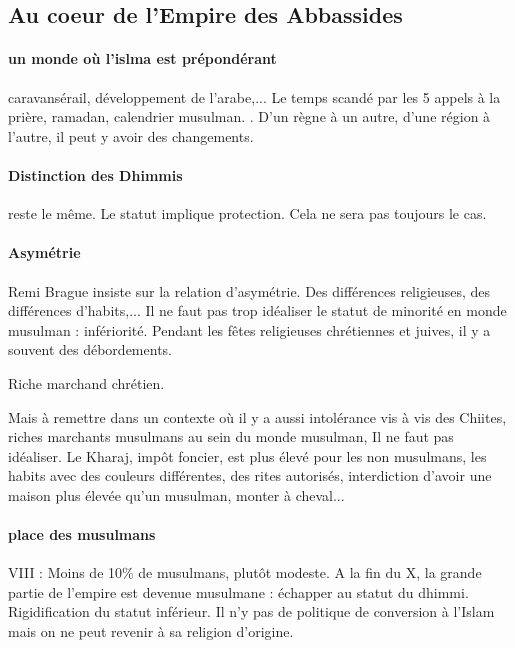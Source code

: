 \subsection{Au coeur de l'Empire des Abbassides}

\paragraph{un monde où l'islma est prépondérant} caravansérail, développement de l'arabe,... Le temps scandé par les 5 appels à la prière, ramadan, calendrier musulman.  . D'un règne à un autre, d'une région à l'autre, il peut y avoir des changements.

\paragraph{Distinction des Dhimmis} reste le même. Le statut implique protection. Cela ne sera pas toujours le cas. 

\paragraph{Asymétrie} Remi Brague insiste sur la relation d'asymétrie.  Des différences religieuses, des différences d'habits,... Il ne faut pas trop idéaliser le statut de minorité en monde musulman : infériorité.
Pendant les fêtes religieuses chrétiennes et juives, il y a souvent des débordements. 
\begin{Ex}
Riche marchand chrétien. 
\end{Ex}

Mais à remettre dans un contexte où il y a aussi intolérance vis à vis des Chiites, riches marchants musulmans au sein du monde musulman,  Il ne faut pas idéaliser. Le Kharaj, impôt foncier, est plus élevé pour les non musulmans, les habits avec des couleurs différentes, des rites autorisés, interdiction d'avoir une maison plus élevée qu'un musulman, monter à cheval...

\paragraph{place des musulmans}
VIII : Moins de 10\% de musulmans, plutôt modeste. A la fin du X, la grande partie de l'empire est devenue musulmane : échapper au statut du dhimmi. Rigidification du statut inférieur. Il n'y pas de politique de conversion à l'Islam mais on ne peut revenir à sa religion d'origine.  

